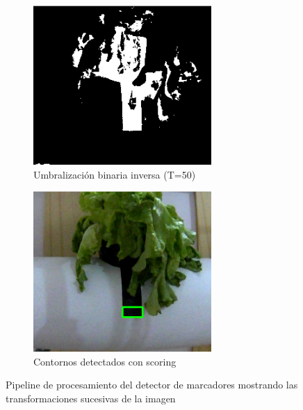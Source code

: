 \begin{figure}[H]
\vspace{0.3cm}

\begin{subfigure}[b]{0.48\textwidth}
    \centering
    \includegraphics[width=\textwidth]{imagenes/detector_marcadores_3_binario.png}
    \caption{Umbralización binaria inversa (T=50)}
\end{subfigure}
\hfill
\begin{subfigure}[b]{0.48\textwidth}
    \centering
    \includegraphics[width=\textwidth]{imagenes/detector_marcadores_4_contornos.png}
    \caption{Contornos detectados con scoring}
\end{subfigure}

\caption{Pipeline de procesamiento del detector de marcadores mostrando las transformaciones sucesivas de la imagen}
\label{fig:proceso_marcadores}
\end{figure}

